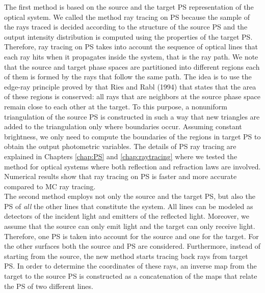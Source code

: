 The first method is based on the source and the target PS representation of the optical system. We called the method ray tracing on PS because the sample of the rays traced is decided according to the structure of the source PS and the output intensity distribution is computed using the properties of the target PS. Therefore, ray tracing on PS takes into account the sequence of optical lines that each ray hits when it propagates inside the system, that is the ray path. We note that the source and target phase spaces are partitioned into different regions each of them is formed by the rays that follow the same path. The idea is to use the edge-ray principle proved by that Ries and Rabl (1994) that states that the area of these regions is conserved: all rays that are neighbors at the source phase space remain close to each other at the target. To this purpose, a nonuniform triangulation of the source PS is constructed in such a way that new triangles are added to the triangulation only where boundaries occur. 
Assuming constant brightness, we only need to compute the boundaries of the regions in target PS to obtain the output photometric variables. 
The details of PS ray tracing are explained in Chapters \ref{chap:PS} and \ref{chap:raytracing} where we tested the method for optical systems where both reflection and refraction laws are involved.
 Numerical results show that ray tracing on  PS is faster and more accurate compared to MC ray tracing.
\\ \indent The second method employs not only the source and the target PS, but also the PS of \textit{all} the other lines that constitute the system.
All lines can be modeled as detectors of the incident light and emitters of the reflected light.
Moreover, we assume that the source can only emit light and the target can only receive light.
Therefore, one PS is taken into account for the source and one for the target. For the other surfaces both the source and PS are considered.
Furthermore, instead of starting from the source, the new method starts tracing back rays from target PS. 
In order to determine the coordinates of these rays, an inverse map from the target to the source PS is constructed as a concatenation of the maps that relate the PS of two different lines.
